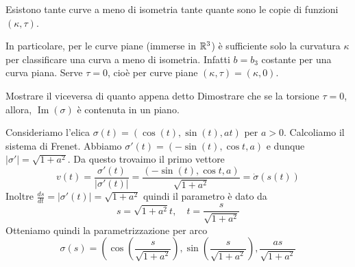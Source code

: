 \documentclass[a4paper]{article}
\begin{document}
Esistono tante curve a meno di isometria tante quante sono le copie
di funzioni \((\kappa, \tau)\).

In particolare, per le curve piane (immerse in \(\mathbb{R}^3\)) è sufficiente solo la curvatura \(\kappa\)
per classificare una curva a meno di isometria.
Infatti \(b = b_3\) costante per una curva piana.
Serve  \(\tau = 0\), cioè per curve piane \((\kappa, \tau) = (\kappa, 0)\).

\begin{snippetexercise}{Mostrare il viceversa di quanto appena detto}
    Dimostrare che se
    la torsione \(\tau = 0\), allora,
    \(\operatorname{Im}(\sigma)\) è contenuta in un piano.
\end{snippetexercise}

\pagebreak

\begin{snippetexample}{}
    \begin{figure}
        \begin{center}
        \end{center}
    \end{figure}
    Consideriamo l'elica \(\sigma(t) = (\cos(t), \sin(t), at)\)
    per \(a>0\). Calcoliamo il sistema di Frenet.
    Abbiamo \(\sigma'(t) = (-\sin(t), \cos t, a)\) e dunque
    \(|\sigma'| = \sqrt{1 + a^2}\).
    Da questo trovaimo il primo vettore
    \[
        v(t) = \frac{\sigma'(t)}{|\sigma'(t)|}
        = \frac{
            (-\sin(t), \cos t, a)
        }{
            \sqrt{1 + a^2}
        } = \dot\sigma(s(t))
    \]
    Inoltre \(\frac{ds}{dt} = |\sigma'(t)| = \sqrt{1 + a^2}\)
    quindi il parametro è dato da
    \[
        s = \sqrt{1 + a^2} t, \quad t = \frac{s}{\sqrt{1 + a^2}}
    \]
    Otteniamo quindi la parametrizzazione per arco
    \[
        \sigma(s) = \left(
            \cos\left(\frac{s}{\sqrt{1 + a^2}}\right), \sin\left(\frac{s}{\sqrt{1 + a^2}}\right), \frac{as}{\sqrt{1 + a^2}}
\]
\end{snippetexample}
\end{document}
